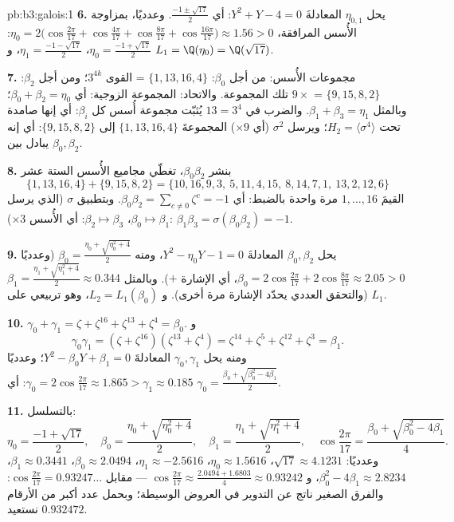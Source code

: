 \begin{solution}{pb:b3:galois:1}
\textbf{6.} يحل $\eta_{0,1}$ المعادلةَ $Y^2 + Y - 4 = 0$: أي $\frac{-1 \pm
\sqrt{17}}2$.
وعدديًا، بمزاوجة الأُسس المرافقة، $\eta_0 = 2\bigl(\cos\tfrac{2\pi}{17} + \cos\tfrac{4\pi}{17} +
\cos\tfrac{8\pi}{17} + \cos\tfrac{16\pi}{17}\bigr) \approx 1.56
> 0$: $\eta_0 = \frac{-1+\sqrt{17}}2$، $\eta_1 =
\frac{-1-\sqrt{17}}2$،
و $L_1 = \Q(\eta_0) = \Q(\sqrt{17})$.

\textbf{7.} مجموعات الأُسس: من أجل $\beta_0$: $\{1, 13, 16, 4\}$ = القوى
$3^{4k}$؛ ومن أجل $\beta_2$: $\{9, 15, 8, 2\}$ = $9 \times$ تلك المجموعة.
والاتحاد: المجموعة الزوجية: أي $\beta_0 + \beta_2 = \eta_0$؛ وبالمثل $\beta_1 + \beta_3 = \eta_1$.
والضرب في $13 = 3^4$ يُثبّت مجموعة أُسس كل $\beta_i$: أي إنها
صامدة تحت $H_2 =
\langle\sigma^4\rangle$؛ ويرسل $\sigma^2$ (أي $\times 9$) المجموعةَ
$\{1,13,16,4\}$ إلى $\{9, 15, 8, 2\}$: أي إنه يبادل بين $\beta_0,
\beta_2$.

\textbf{8.} بنشر $\beta_0\beta_2$، تغطّي مجاميع الأُسس الستة عشر
\[
\{1,13,16,4\} + \{9,15,8,2\} =
\{10,16,9,3,\ 5,11,4,15,\ 8,14,7,1,\ 13,2,12,6\}
\]
القيمَ $1, \dots, 16$ مرة واحدة بالضبط: أي $\beta_0\beta_2 =
\sum_{c\ne0}\zeta^c = -1$. وبتطبيق
$\sigma$ (الذي يرسل $\beta_0 \mapsto \beta_1$، $\beta_2 \mapsto \beta_3$: أي الأُسس $\times 3$):
$\beta_1\beta_3 = \sigma(\beta_0\beta_2)
= -1$.

\textbf{9.} يحل $\beta_0, \beta_2$ المعادلةَ $Y^2 - \eta_0 Y - 1 = 0$، ومنه $\beta_0 = \frac{\eta_0 + \sqrt{\eta_0^2 + 4}}2$
(وعدديًا $\beta_0 = 2\cos\frac{2\pi}{17} + 2\cos\frac{8\pi}{17} \approx
2.05 > 0$، أي الإشارة $+$). وبالمثل $\beta_1 = \frac{\eta_1 +
\sqrt{\eta_1^2 + 4}}2 \approx 0.344$ (والتحقق
العددي يحدّد الإشارة مرة أخرى). و $L_2 = L_1(\beta_0)$، وهو تربيعي على $L_1$.

\textbf{10.} $\gamma_0 + \gamma_1 = \zeta + \zeta^{16} +
\zeta^{13} + \zeta^4 = \beta_0$. و
\[
\gamma_0\gamma_1 = (\zeta + \zeta^{16})(\zeta^{13} + \zeta^4)
= \zeta^{14} + \zeta^{5} + \zeta^{12} + \zeta^{3} = \beta_1 .
\]
ومنه يحل $\gamma_0, \gamma_1$ المعادلةَ $Y^2 - \beta_0Y + \beta_1 = 0$؛ وعدديًا $\gamma_0 = 2\cos\frac{2\pi}{17} \approx 1.865 >
\gamma_1 \approx 0.185$: أي $\gamma_0 = \frac{\beta_0 +
\sqrt{\beta_0^2 - 4\beta_1}}2$.

\textbf{11.} بالتسلسل:
\[
\eta_0 = \frac{-1 + \sqrt{17}}2,
\quad
\beta_0 = \frac{\eta_0 + \sqrt{\eta_0^2 + 4}}2,
\quad
\beta_1 = \frac{\eta_1 + \sqrt{\eta_1^2 + 4}}2,
\quad
\cos\frac{2\pi}{17} = \frac{\beta_0 + \sqrt{\beta_0^2 -
4\beta_1}}4 .
\]
وعدديًا: $\sqrt{17} \approx 4.1231$، $\eta_0 \approx
1.5616$، $\eta_1 \approx -2.5616$، $\beta_0 \approx 2.0494$، $\beta_1 \approx 0.3441$، $\beta_0^2 - 4\beta_1 \approx
2.8234$،
و $\cos\frac{2\pi}{17} \approx \frac{2.0494 +
1.6803}4 \approx 0.93242$ --- مقابل $\cos\frac{2\pi}{17} =
0.93247\dots$: والفرق الصغير ناتج عن التدوير في
العروض الوسيطة؛ وبحمل عدد أكبر من الأرقام نستعيد $0.932472$.


\end{solution}
